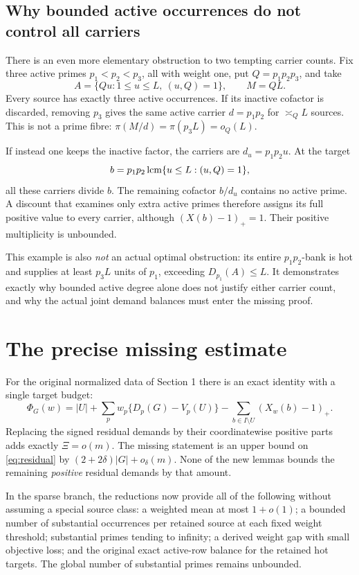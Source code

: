 \documentclass[11pt,a4paper]{article}
\theoremstyle{remark}\newtheorem{remark}[theorem]{Remark}
\newcommand{\pos}[1]{(#1)_+}
\begin{document}
\subsection{Why bounded active occurrences do not control all carriers}

There is an even more elementary obstruction to two tempting carrier
counts. Fix three active primes \(p_1<p_2<p_3\), all with weight one,
put \(Q=p_1p_2p_3\), and take
\[
 A=\{Qu:1\le u\le L,\ (u,Q)=1\},\qquad M=QL.
\]
Every source has exactly three active occurrences. If its inactive
cofactor is discarded, removing \(p_3\) gives the same active carrier
\(d=p_1p_2\) for \(\asymp_Q L\) sources. This is not a prime fibre:
\(\pi(M/d)=\pi(p_3L)=o_Q(L)\).

If instead one keeps the inactive factor, the carriers are
\(d_u=p_1p_2u\). At the target
\[
 b=p_1p_2\mathop{\rm lcm}\{u\le L:(u,Q)=1\},
\]
all these carriers divide \(b\). The remaining cofactor \(b/d_u\)
contains no active prime. A discount that examines only extra active
primes therefore assigns its full positive value to every carrier,
although \((X(b)-1)_+=1\). Their positive multiplicity is unbounded.

This example is also \emph{not} an actual optimal obstruction: its
entire \(p_1p_2\)-bank is hot and supplies at least \(p_3L\) units of
\(p_1\), exceeding \(D_{p_1}(A)\le L\). It demonstrates exactly why
bounded active degree alone does not justify either carrier count,
and why the actual joint demand balances must enter the missing proof.

\section{The precise missing estimate}

For the original normalized data of Section 1 there is an exact
identity with a single target budget:
\begin{equation}
 \Phi_G(w)=|U|+\sum_pw_p\{D_p(G)-V_p(U)\}
       -\sum_{b\in I\setminus U}\pos{X_w(b)-1}.
 \label{eq:residual}
\end{equation}
Replacing the signed residual demands by their coordinatewise
positive parts adds exactly \(\Xi=o(m)\). The missing statement is
an upper bound on \eqref{eq:residual} by
\((2+2\delta)|G|+o_\delta(m)\). None of the new lemmas bounds the
remaining \emph{positive} residual demands by that amount.

In the sparse branch, the reductions now provide all of the following
without assuming a special source class: a weighted mean at most
\(1+o(1)\); a bounded number of substantial occurrences per retained
source at each fixed weight threshold; substantial primes tending to
infinity; a derived weight gap with small objective loss; and the
original exact active-row balance for the retained hot targets.
The global number of substantial primes remains unbounded.
\end{document}
